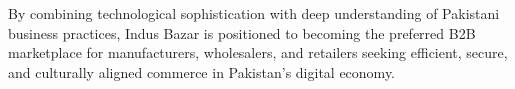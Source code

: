 By combining technological sophistication with deep understanding of Pakistani business practices, Indus Bazar is positioned to becoming the preferred B2B marketplace for manufacturers, wholesalers, and retailers seeking efficient, secure, and culturally aligned commerce in Pakistan's digital economy.





